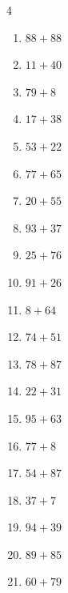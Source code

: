 \begin{multicols}{4}
\begin{enumerate}
  \item $88+88$
        \phantom{$=176$}

  \item $11+40$
        \phantom{$=51$}

  \item $79+8$
        \phantom{$=87$}

  \item $17+38$
        \phantom{$=55$}

  \item $53+22$
        \phantom{$=75$}

  \item $77+65$
        \phantom{$=142$}

  \item $20+55$
        \phantom{$=75$}

  \item $93+37$
        \phantom{$=130$}

\columnbreak %

  \item $25+76$
        \phantom{$=101$}

  \item $91+26$
        \phantom{$=117$}

  \item $8+64$
        \phantom{$=72$}

  \item $74+51$
        \phantom{$=125$}

  \item $78+87$
        \phantom{$=165$}

  \item $22+31$
        \phantom{$=53$}

  \item $95+63$
        \phantom{$=158$}

  \item $77+8$
        \phantom{$=85$}

  \item $54+87$
        \phantom{$=141$}

  \item $37+7$
        \phantom{$=44$}

  \item $94+39$
        \phantom{$=133$}

  \item $89+85$
        \phantom{$=174$}

  \item $60+79$
        \phantom{$=139$}


\end{enumerate}
\end{multicols}
